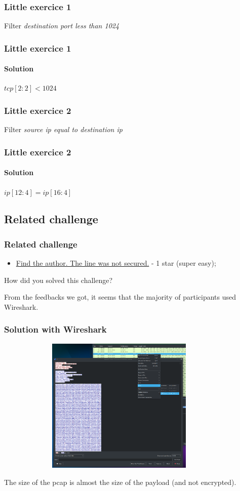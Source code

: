 \documentclass[]{beamer}
\begin{document}
\begin{frame}
\frametitle{Little exercice 1}
Filter \textit{destination port less than 1024}
\end{frame}

\begin{frame}
\frametitle{Little exercice 1}
\framesubtitle{Solution}
$tcp[2:2] < 1024$
\end{frame}



\begin{frame}
\frametitle{Little exercice 2}
Filter \textit{source ip equal to destination ip}
\end{frame}

\begin{frame}
\frametitle{Little exercice 2}
\framesubtitle{Solution}
$ip[12:4] = ip[16:4]$
\end{frame}




\subsection{Related challenge}
\begin{frame}
\frametitle{Related challenge}
\begin{itemize}
\item \href{https://github.com/cscluxembourg/vestatech/blob/master/challenges/find-the-author/gift.cap}{Find the author. The line was not secured.} - 1 star (super easy);
\end{itemize}
\bigskip
How did you solved this challenge?

\bigskip
From the feedbacks we got, it seems that the majority of participants used Wireshark.
\end{frame}


\begin{frame}
\frametitle{Solution with Wireshark}
\begin{center}
    \includegraphics[height=6.5cm, width=12.0cm]{./images/Wireshark_follow_http_stream.png}
\end{center}
The size of the pcap is almost the size of the payload (and not encrypted).
\end{frame}
 
\end{document}
